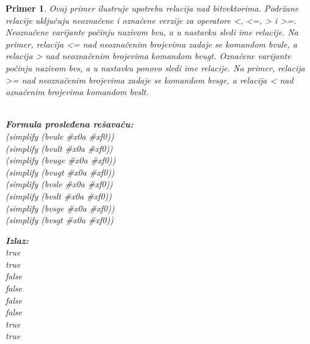 \documentclass[12pt,oneside]{memoir}
\newtheorem{primer}{Primer}
\begin{document}
\begin{primer} Ovaj primer ilustruje upotrebu relacija nad bitvektorima. Podržane relacije uključuju neoznačene i označene verzije za operatore <, <=, > i >=. Neoznačene varijante počinju nazivom bvu, a u nastavku sledi ime relacije. Na primer, relacija <= nad neoznačenim brojevima zadaje se komandom bvule, a relacija > nad neoznačenim brojevima komandom bvugt. Označene varijante počinju nazivom bvs, a u nastavku ponovo sledi ime relacije. Na primer, relacija >= nad neoznačenim brojevima zadaje se komandom bvsge, a relacija < nad označenim brojevima komandom bvslt.
\\ \\ 
\begin{minipage}[b]{0.5\textwidth}
\textbf{Formula prosleđena rešavaču:}
\\(simplify (bvule \#x0a \#xf0))  
\\(simplify (bvult \#x0a \#xf0))  
\\(simplify (bvuge \#x0a \#xf0))  
\\(simplify (bvugt \#x0a \#xf0))  
\\(simplify (bvsle \#x0a \#xf0)) 
\\(simplify (bvslt \#x0a \#xf0))  
\\(simplify (bvsge \#x0a \#xf0))  
\\(simplify (bvsgt \#x0a \#xf0))

\end{minipage}
\hspace{2cm} 
\begin{minipage}[t]{0.5\textwidth}
\vspace{-5.3cm}
\textbf{Izlaz:}
\\true 
\\true 
\\false 
\\false 
\\false 
\\false 
\\true 
\\true
\end{minipage}


\end{primer}
\end{document}
